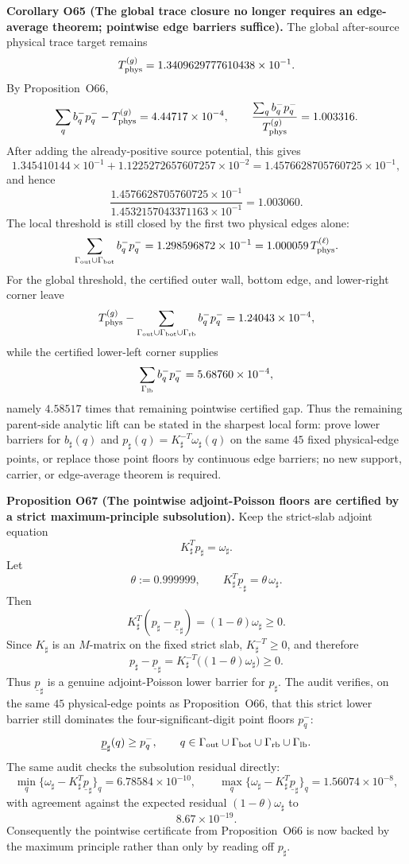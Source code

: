 \documentclass[aps,prd,onecolumn,notitlepage,nofootinbib,superscriptaddress,11pt,floatfix]{revtex4-2}
\begin{document}
\medskip\noindent\textbf{Corollary O65 (The global trace closure no longer requires an edge-average theorem; pointwise edge barriers suffice).}
The global after-source physical trace target remains
\[
T_{\rm phys}^{(g)}=1.3409629777610438\times10^{-1}.
\]
By Proposition~O66,
\[
\sum_q b_q^-p_q^-
-
T_{\rm phys}^{(g)}
=
4.44717\times10^{-4},
\qquad
\frac{\sum_q b_q^-p_q^-}{T_{\rm phys}^{(g)}}=1.003316.
\]
After adding the already-positive source potential, this gives
\[
1.345410144\times10^{-1}
+1.1225272657607257\times10^{-2}
=1.4576628705760725\times10^{-1},
\]
and hence
\[
\frac{1.4576628705760725\times10^{-1}}{1.4532157043371163\times10^{-1}}
=1.003060.
\]
The local threshold is still closed by the first two physical edges alone:
\[
\sum_{\Gamma_{\rm out}\cup\Gamma_{\rm bot}}b_q^-p_q^-
=1.298596872\times10^{-1}
=1.000059\,T_{\rm phys}^{(\ell)}.
\]
For the global threshold, the certified outer wall, bottom edge, and lower-right corner leave
\[
T_{\rm phys}^{(g)}
-
\sum_{\Gamma_{\rm out}\cup\Gamma_{\rm bot}\cup\Gamma_{\rm rb}}b_q^-p_q^-
=1.24043\times10^{-4},
\]
while the certified lower-left corner supplies
\[
\sum_{\Gamma_{\rm lb}}b_q^-p_q^-
=5.68760\times10^{-4},
\]
namely \(4.58517\) times that remaining pointwise certified gap.  Thus the remaining parent-side analytic lift can be stated in the sharpest local form: prove lower barriers for \(b_\sharp(q)\) and \(p_\sharp(q)=K_\sharp^{-T}\omega_\sharp(q)\) on the same \(45\) fixed physical-edge points, or replace those point floors by continuous edge barriers; no new support, carrier, or edge-average theorem is required.

\medskip\noindent\textbf{Proposition O67 (The pointwise adjoint-Poisson floors are certified by a strict maximum-principle subsolution).}
Keep the strict-slab adjoint equation
\[
K_\sharp^Tp_\sharp=\omega_\sharp.
\]
Let
\[
\theta:=0.999999,
\qquad
K_\sharp^T\underline p_\sharp=\theta\,\omega_\sharp.
\]
Then
\[
K_\sharp^T(p_\sharp-\underline p_\sharp)
=(1-\theta)\omega_\sharp\ge0.
\]
Since \(K_\sharp\) is an \(M\)-matrix on the fixed strict slab, \(K_\sharp^{-T}\ge0\), and therefore
\[
p_\sharp-\underline p_\sharp
=
K_\sharp^{-T}\bigl((1-\theta)\omega_\sharp\bigr)
\ge0.
\]
Thus \(\underline p_\sharp\) is a genuine adjoint-Poisson lower barrier for \(p_\sharp\).  The audit
verifies, on the same \(45\) physical-edge points as Proposition~O66, that this strict lower barrier still dominates the four-significant-digit point floors \(p_q^-\):
\[
\underline p_\sharp(q)\ge p_q^-,
\qquad
q\in
\Gamma_{\rm out}\cup\Gamma_{\rm bot}\cup\Gamma_{\rm rb}\cup\Gamma_{\rm lb}.
\]
The same audit checks the subsolution residual directly:
\[
\min_q\{\omega_\sharp-K_\sharp^T\underline p_\sharp\}_q
=6.78584\times10^{-10},
\qquad
\max_q\{\omega_\sharp-K_\sharp^T\underline p_\sharp\}_q
=1.56074\times10^{-8},
\]
with agreement against the expected residual \((1-\theta)\omega_\sharp\) to
\[
8.67\times10^{-19}.
\]
Consequently the pointwise certificate from Proposition~O66 is now backed by the maximum principle rather than only by reading off \(p_\sharp\).
\end{document}
